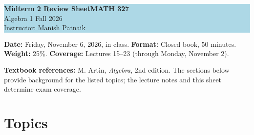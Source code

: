 \documentclass[11pt,reqno]{amsart}
\begin{document}
\begin{center}
\colorbox{lightblue}{\begin{minipage}{0.94\textwidth}
\vspace{0.5em}
{\color{courseblue}\bfseries\Large Midterm 2 Review Sheet\hfill MATH 327}\\[0.35em]
Algebra 1 \hfill Fall 2026\\
Instructor: Manish Patnaik
\vspace{0.5em}
\end{minipage}}
\end{center}
\textbf{Date:} Friday, November 6, 2026, in class.\quad
\textbf{Format:} Closed book, 50 minutes.\\
\textbf{Weight:} 25\%.\quad
\textbf{Coverage:} Lectures 15--23 (through Monday, November 2).

\smallskip
\noindent\textbf{Textbook references:} M. Artin, \emph{Algebra}, 2nd edition.
The sections below provide background for the listed topics; the lecture notes
and this sheet determine exam coverage.

\section*{Topics}
\end{document}
